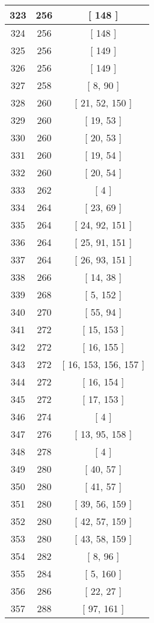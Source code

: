 \begin{center}
\begin{longtable}[H]{|| c c c ||}
\hline
323 & 256 & [ 148 ] \\ 
\hline
324 & 256 & [ 148 ] \\ 
\hline
325 & 256 & [ 149 ] \\ 
\hline
326 & 256 & [ 149 ] \\ 
\hline
327 & 258 & [ 8, 90 ] \\ 
\hline
328 & 260 & [ 21, 52, 150 ] \\ 
\hline
329 & 260 & [ 19, 53 ] \\ 
\hline
330 & 260 & [ 20, 53 ] \\ 
\hline
331 & 260 & [ 19, 54 ] \\ 
\hline
332 & 260 & [ 20, 54 ] \\ 
\hline
333 & 262 & [ 4 ] \\ 
\hline
334 & 264 & [ 23, 69 ] \\ 
\hline
335 & 264 & [ 24, 92, 151 ] \\ 
\hline
336 & 264 & [ 25, 91, 151 ] \\ 
\hline
337 & 264 & [ 26, 93, 151 ] \\ 
\hline
338 & 266 & [ 14, 38 ] \\ 
\hline
339 & 268 & [ 5, 152 ] \\ 
\hline
340 & 270 & [ 55, 94 ] \\ 
\hline
341 & 272 & [ 15, 153 ] \\ 
\hline
342 & 272 & [ 16, 155 ] \\ 
\hline
343 & 272 & [ 16, 153, 156, 157 ] \\ 
\hline
344 & 272 & [ 16, 154 ] \\ 
\hline
345 & 272 & [ 17, 153 ] \\ 
\hline
346 & 274 & [ 4 ] \\ 
\hline
347 & 276 & [ 13, 95, 158 ] \\ 
\hline
348 & 278 & [ 4 ] \\ 
\hline
349 & 280 & [ 40, 57 ] \\ 
\hline
350 & 280 & [ 41, 57 ] \\ 
\hline
351 & 280 & [ 39, 56, 159 ] \\ 
\hline
352 & 280 & [ 42, 57, 159 ] \\ 
\hline
353 & 280 & [ 43, 58, 159 ] \\ 
\hline
354 & 282 & [ 8, 96 ] \\ 
\hline
355 & 284 & [ 5, 160 ] \\ 
\hline
356 & 286 & [ 22, 27 ] \\ 
\hline
357 & 288 & [ 97, 161 ] \\ 

\end{longtable}
\end{center}
